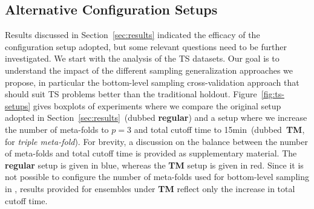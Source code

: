 
\subsection{Alternative Configuration Setups}
\label{sec:alt-setups}

Results discussed in Section~\ref{sec:results} indicated the efficacy of the configuration setup adopted, but some relevant questions need to be further investigated. We start with the analysis of the TS datasets. Our goal is to understand the impact of the different sampling generalization approaches we propose, in particular the bottom-level sampling cross-validation approach that should suit TS problems better than the traditional holdout.
Figure~\ref{fig:ts-setups} gives boxplots of experiments where we compare the original setup adopted in Section~\ref{sec:results}~(dubbed \textbf{regular}) and a setup where we increase the number of meta-folds to $p=3$ and total cutoff time to 15min~(dubbed~\textbf{TM}, for \textit{triple meta-fold}). For brevity, a discussion on the balance between the number of meta-folds and total cutoff time is provided as supplementary material.
%
The \textbf{regular} setup is given in blue, whereas the \textbf{TM} setup is given in red. Since it is not possible to configure the number of meta-folds used for bottom-level sampling in \autosklearn, results provided for ensembles under \textbf{TM} reflect only the increase in total cutoff time. 

